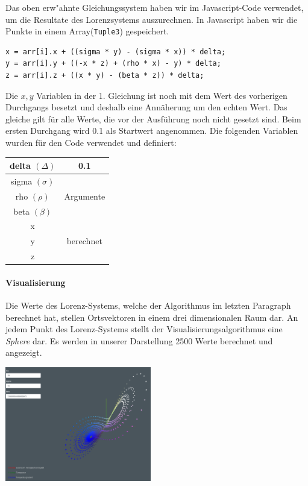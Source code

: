 Das oben erw"ahnte Gleichungssystem haben wir im Javascript-Code verwendet, um die Resultate des Lorenzsystems auszurechnen. In Javascript haben wir die Punkte in einem Array(\texttt{Tuple3}) gespeichert.

\begin{centerFigure}
\begin{lstlisting}
x = arr[i].x + ((sigma * y) - (sigma * x)) * delta;
y = arr[i].y + ((-x * z) + (rho * x) - y) * delta;
z = arr[i].z + ((x * y) - (beta * z)) * delta;
\end{lstlisting}
\end{centerFigure}

Die $ x, y $ Variablen in der 1. Gleichung ist noch mit dem Wert des vorherigen Durchgangs besetzt und deshalb eine Annäherung um den echten Wert. Das gleiche gilt für alle Werte, die vor der Ausführung noch nicht gesetzt sind. Beim ersten Durchgang wird 0.1 als Startwert angenommen. Die folgenden Variablen wurden für den Code verwendet und definiert:

\begin{centerFigure}
	\begin{tabular}{| c | c |}
		\hline
		delta $ (\Delta) $ & 0.1 \\\hline
		sigma $ (\sigma) $ & \multirow{3}{*}{Argumente}\\
		rho $(\rho) $ & \\
		beta $ (\beta) $ & \\\hline
		x & \multirow{3}{*}{berechnet}\\
		y & \\
		z & \\\hline
	\end{tabular}
\end{centerFigure}

\paragraph{Visualisierung}
Die Werte des Lorenz-Systems, welche der Algorithmus im letzten Paragraph berechnet hat, stellen Ortsvektoren in einem drei dimensionalen Raum dar. An jedem Punkt des Lorenz-Systems stellt der Visualisierungsalgorithmus eine \textit{Sphere} dar. Es werden in unserer Darstellung 2500 Werte berechnet und angezeigt.

\begin{centerFigure}
	\includegraphics[height=5cm]{lorenz/assets/implementation/Visualisierung}
\end{centerFigure}

